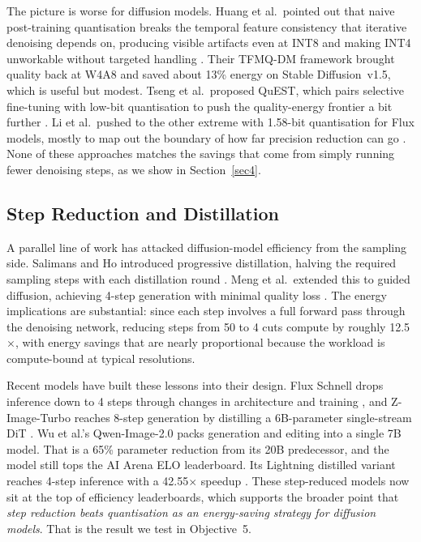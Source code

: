 \documentclass[AMS,STIX2COL]{WileyNJD-v2}
\begin{document}
The picture is worse for diffusion models. Huang et al.\ pointed out that naive post-training quantisation breaks the temporal feature consistency that iterative denoising depends on, producing visible artifacts even at INT8 and making INT4 unworkable without targeted handling \cite{huang2024tfmqdm}. Their TFMQ-DM framework brought quality back at W4A8 and saved about 13\% energy on Stable Diffusion~v1.5, which is useful but modest. Tseng et al.\ proposed QuEST, which pairs selective fine-tuning with low-bit quantisation to push the quality-energy frontier a bit further \cite{tseng2024quest}. Li et al.\ pushed to the other extreme with 1.58-bit quantisation for Flux models, mostly to map out the boundary of how far precision reduction can go \cite{li2024158bitflux}. None of these approaches matches the savings that come from simply running fewer denoising steps, as we show in Section~\ref{sec4}.

\subsection{Step Reduction and Distillation}

A parallel line of work has attacked diffusion-model efficiency from the sampling side. Salimans and Ho introduced progressive distillation, halving the required sampling steps with each distillation round \cite{salimans2022progressive}. Meng et al.\ extended this to guided diffusion, achieving 4-step generation with minimal quality loss \cite{meng2023distillation}. The energy implications are substantial: since each step involves a full forward pass through the denoising network, reducing steps from 50 to 4 cuts compute by roughly 12.5$\times$, with energy savings that are nearly proportional because the workload is compute-bound at typical resolutions.

Recent models have built these lessons into their design. Flux Schnell drops inference down to 4 steps through changes in architecture and training \cite{bfl2024flux}, and Z-Image-Turbo reaches 8-step generation by distilling a 6B-parameter single-stream DiT \cite{tongyi2025zimage}. Wu et al.'s Qwen-Image-2.0 packs generation and editing into a single 7B model. That is a 65\% parameter reduction from its 20B predecessor, and the model still tops the AI Arena ELO leaderboard. Its Lightning distilled variant reaches 4-step inference with a 42.55$\times$ speedup \cite{wu2025qwenimage}. These step-reduced models now sit at the top of efficiency leaderboards, which supports the broader point that \textit{step reduction beats quantisation as an energy-saving strategy for diffusion models}. That is the result we test in Objective~5.
\end{document}
